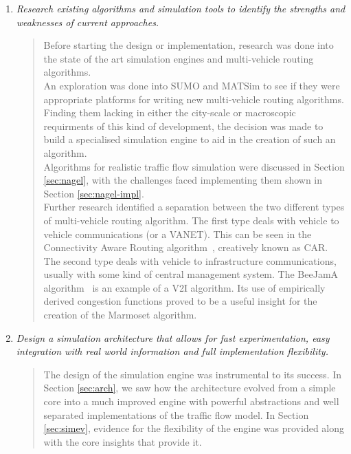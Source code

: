\documentclass[ %
                    author={Alexander Hill},
                supervisor={Dr. Benjamin Sach},
                    degree={MEng},
                     title={MARMOSET},
                  subtitle={Multi-Agent Route Management using Online Simulation for Efficient Transportation},
                      type={research},
                      year={2016} ]{dissertation}
\begin{document}
\begin{enumerate}
    \item \textit{Research existing algorithms and simulation tools to identify the
        strengths and weaknesses of current approaches.}
    \begin{quote}
        Before starting the design or implementation, research was done into the
        state of the art simulation engines and multi-vehicle routing
        algorithms. \\

        An exploration was done into SUMO and MATSim to see if they were
        appropriate platforms for writing new multi-vehicle routing algorithms.
        Finding them lacking in either the city-scale or macroscopic requirments
        of this kind of development, the decision was made to build a
        specialised simulation engine to aid in the creation of such an
        algorithm. \\

        Algorithms for realistic traffic flow simulation were discussed in Section
        \ref{sec:nagel}, with the challenges faced implementing them shown in
        Section \ref{sec:nagel-impl}. \\

        Further research identified a separation between the two different types
        of multi-vehicle routing algorithm. The first type deals with vehicle to vehicle
        communications (or a VANET). This can be seen in the Connectivity Aware Routing
        algorithm~\cite{rt:car}, creatively known as CAR. The second type deals with
        vehicle to infrastructure communications, usually with some kind of
        central management system. The BeeJamA algorithm~\cite{beejama} is an
        example of a V2I algorithm. Its use of empirically derived congestion
        functions proved to be a useful insight for the creation of the Marmoset
        algorithm.
    \end{quote}

    \item \textit{Design a simulation architecture that allows for fast experimentation,
        easy integration with real world information and full implementation flexibility.}
    \begin{quote}
        The design of the simulation engine was instrumental to its success. In
        Section \ref{sec:arch}, we saw how the architecture evolved from a
        simple core into a much improved engine with powerful abstractions and
        well separated implementations of the traffic flow model. In Section
        \ref{sec:simev}, evidence for the flexibility of the engine was provided
        along with the core insights that provide it. \\


\end{quote}
\end{enumerate}
\end{document}
